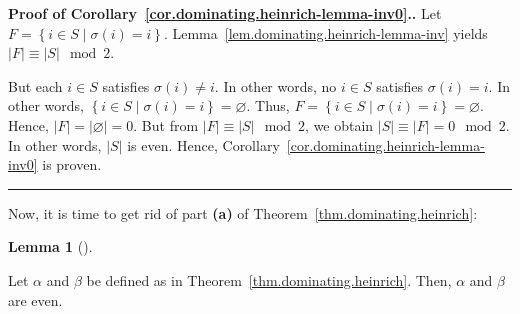 \documentclass[numbers=enddot,12pt,final,onecolumn,notitlepage]{scrartcl}%
\theoremstyle{definition}
\newtheorem{lem}[theo]{Lemma}
\newenvironment{lemma}[1][]
{\begin{lem}[#1]\begin{leftbar}}
{\end{leftbar}\end{lem}}
\newenvironment{proof}[1][Proof]{\noindent\textbf{#1.} }{\ \rule{0.5em}{0.5em}}
\newcommand{\set}[1]{\left\{ #1 \right\}}
\newcommand{\abs}[1]{\left| #1 \right|}
\newcommand{\tup}[1]{\left( #1 \right)}
\begin{document}
\begin{proof}[Proof of Corollary~\ref{cor.dominating.heinrich-lemma-inv0}.]
Let $F = \set{ i \in S \mid \sigma\tup{i} = i }$.
Lemma~\ref{lem.dominating.heinrich-lemma-inv} yields
$\abs{F} \equiv \abs{S} \mod 2$.

But each $i \in S$ satisfies $\sigma\tup{i} \neq i$. In other
words, no $i \in S$ satisfies $\sigma\tup{i} = i$. In other
words, $\set{ i \in S \mid \sigma\tup{i} = i } = \varnothing$.
Thus, $F = \set{ i \in S \mid \sigma\tup{i} = i }
= \varnothing$. Hence,
$\abs{F} = \abs{\varnothing} = 0$. But from
$\abs{F} \equiv \abs{S} \mod 2$, we obtain
$\abs{S} \equiv \abs{F} = 0 \mod 2$. In other words, $\abs{S}$
is even. Hence, Corollary~\ref{cor.dominating.heinrich-lemma-inv0}
is proven.
\end{proof}

Now, it is time to get rid of part \textbf{(a)} of
Theorem~\ref{thm.dominating.heinrich}:

\begin{lemma} \label{lem.dominating.heinrich-lemma.a}
Let $\alpha$ and $\beta$ be defined as in
Theorem~\ref{thm.dominating.heinrich}. Then, $\alpha$ and $\beta$ are
even.
\end{lemma}
\end{document}
